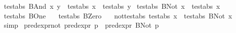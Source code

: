 \begin{isabellebody}
{}\ {}test{}abs\ {}BAnd\ x\ y{}\ {}\ test{}abs\ x\ {}\ test{}abs\ y{}\isanewline
{}\ {}test{}abs\ {}BNot\ x{}\ {}\ {}{}test{}abs\ x{}{}\isanewline
{}\ {}test{}abs\ BOne\ {}\ {}{}\isanewline
{}\ {}test{}abs\ BZero\ {}\ {}{}\isanewline
\isanewline
{}\isamarkupfalse%
\ not{}test{}abs{}\ {}{}{}test{}abs\ x{}\ {}\ test{}abs\ {}BNot\ x{}{}%
\isadelimproof
\ %
\endisadelimproof
%
\isatagproof
{}\isamarkupfalse%
\ simp%
\endisatagproof
{\isafoldproof}%
%
\isadelimproof
%
\endisadelimproof
\isanewline
\isanewline
{}\isamarkupfalse%
\ pred{}expr{}not{}\ {}{}{}pred{}expr\ p{}\ {}\ pred{}expr\ {}BNot\ p{}{}\isanewline

\end{isabellebody}
